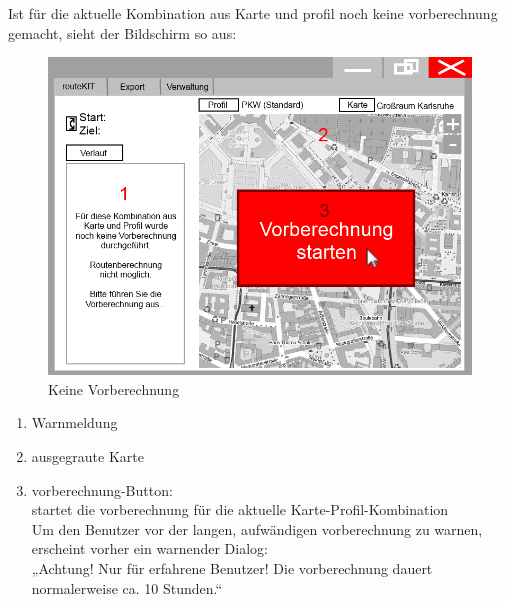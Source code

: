 \documentclass[a4paper, 11pt]{article}
\begin{document}
Ist für die aktuelle Kombination aus Karte und \gls{profil} noch keine \gls{vorberechnung} gemacht, sieht der Bildschirm so aus:
\begin{figure}[H]
\centering
\includegraphics[width=0.9\linewidth]{mockup_screenshot_nicht_berechnet}
\caption{Keine Vorberechnung}
\label{fig:mockupscreenshotkeinevorberechnung}
\end{figure}
\begin{enumerate}
\item Warnmeldung
\item ausgegraute Karte
\item \gls{vorberechnung}-Button:\\
startet die \gls{vorberechnung} für die aktuelle Karte-Profil-Kombination\\
Um den Benutzer vor der langen, aufwändigen \gls{vorberechnung} zu warnen, erscheint vorher ein warnender Dialog:\\
„Achtung! Nur für erfahrene Benutzer! Die \gls{vorberechnung} dauert normalerweise ca. 10 Stunden.“
\end{enumerate}
\end{document}
